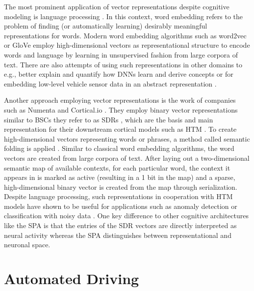 The most prominent application of vector representations despite cognitive modeling \cite{Blouw2016, Crawford2016, Eliasmith2012} is language processing \cite{Gayler2003}.
In this context, word embedding refers to the problem of finding (or automatically learning) desirably meaningful representations for words.
Modern word embedding algorithms such as word2vec \cite{Mikolov2013, Mikolov2013b} or \ac{GloVe} \cite{Pennington2014} employ high-dimensional vectors as representational structure to encode words and language by learning in unsupervised fashion from large corpora of text.
There are also attempts of using such representations in other domains to e.g., better explain and quantify how \acp{DNN} learn and derive concepts \cite{Fong2018} or for embedding low-level vehicle sensor data in an abstract representation \cite{Hallac2018}.

Another approach employing vector representations is the work of companies such as Numenta \cite{Numenta} and Cortical.io \cite{Cortialio}.
They employ binary vector representations similar to \acp{BSC} they refer to as \acp{SDR} \cite{Ahmad2015}, which are the basis and main representation for their downstream cortical models such as \ac{HTM} \cite{Cui2017}.
To create high-dimensional vectors representing words or phrases, a method called semantic folding is applied \cite{Webber2016}.
Similar to classical word embedding algorithms, the word vectors are created from large corpora of text.
After laying out a two-dimensional semantic map of available contexts, for each particular word, the context it appears in is marked as active (resulting in a \num{1} bit in the map) and a sparse, high-dimensional binary vector is created from the map through serialization.
Despite language processing, such representations in cooperation with \ac{HTM} models have shown to be useful for applications such as anomaly detection \cite{Ahmad2017} or classification with noisy data \cite{Ahmad2019}. 
One key difference to other cognitive architectures like the \ac{SPA} is that the entries of the \ac{SDR} vectors are directly interpreted as neural activity whereas the \ac{SPA} distinguishes between representational and neuronal space.

\section{Automated Driving}
\label{sec:automated_driving}

